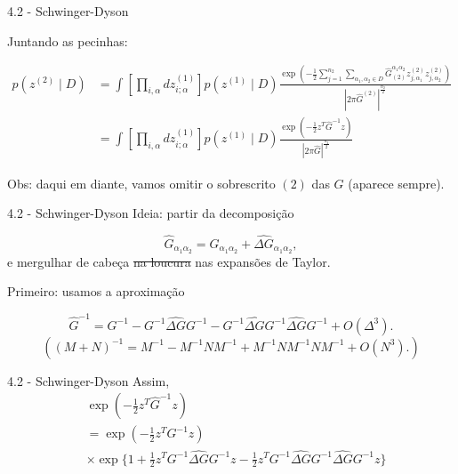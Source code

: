 \documentclass{beamer}
\begin{document}
\begin{frame}{4.2 - Schwinger-Dyson}

    Juntando as pecinhas:
    
    \small

    \begin{align*}
        p(z^{(2)}\mid D) &= \int \left[
            \prod_{i,\alpha} dz_{i;\alpha}^{(1)} 
        \right]
        p(z^{(1)}\mid D) \frac{
            \exp\left(
                - \frac 1 2 \sum_{j=1}^{n_2} \sum_{\alpha_1,\alpha_2 \in D} \widehat{G}^{\alpha_1 \alpha_2}_{(2)} z_{j,\alpha_1}^{(2)}z_{j,\alpha_2}^{(2)}
            \right)
        }{
            |2\pi \widehat G^{(2)}|^{\frac{n_2}{2}}   
        } \\
        &= \int \left[
            \prod_{i,\alpha} dz_{i;\alpha}^{(1)} 
        \right]
        p(z^{(1)}\mid D) \frac{
            \exp\left(
                - \frac 1 2 z^T \widehat G^{-1} z
            \right)
        }{
            |2\pi \widehat G|^{\frac{n_2}{2}}   
        }
    \end{align*}

    Obs: daqui em diante, vamos omitir o sobrescrito $(2)$ das $G$ (aparece sempre).
\end{frame}

\begin{frame}{4.2 - Schwinger-Dyson}
    Ideia: partir da decomposição

    \begin{equation*}
        \widehat G_{\alpha_1 \alpha_2} = G_{\alpha_1 \alpha_2} + \widehat{\Delta G}_{\alpha_1 \alpha_2},
    \end{equation*}
    \pause
    e mergulhar de cabeça \st{na loucura} nas expansões de Taylor.
    \pause

    Primeiro: usamos a aproximação

    \begin{equation*}
        \widehat G^{-1} = G^{-1} - G^{-1} \widehat{\Delta G} G^{-1} - G^{-1} \widehat{\Delta G} G^{-1} \widehat{\Delta G} G^{-1} + O(\Delta^3).
    \end{equation*}
    \pause
    \begin{equation*}
        \left((M+N)^{-1} = M^{-1} - M^{-1} N M^{-1} + M^{-1} N M^{-1} N M^{-1} + O(N^3).
        \right)
    \end{equation*}
\end{frame}

\begin{frame}{4.2 - Schwinger-Dyson}
    Assim,
    \small
    \begin{align*}
        &\exp \left(
            - \frac 1 2 z^T \widehat G^{-1} z 
        \right) \\
        &= \exp \left(
            - \frac 1 2 z^T G^{-1} z 
        \right)\\
        & \times \exp \{
            1 + \frac 1 2 z^T G^{-1} \widehat{\Delta G} G^{-1} z - \frac 1 2 z^T G^{-1} \widehat{\Delta G} G^{-1} \widehat{\Delta G} G^{-1} z
        \}
    \end{align*}

\end{frame}
\end{document}

